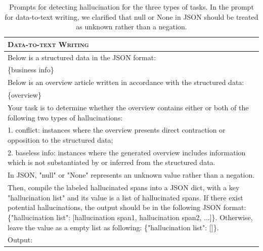 \begin{table}[!ht]
\begin{tabular}{p{}}
    \midrule
    \textbf{\textsc{Data-to-text Writing}}\\
    \midrule
Below is a structured data in the JSON format:\\
\{business info\}\\
Below is an overview article written in accordance with the structured data:\\
\{overview\}\\
Your task is to determine whether the overview contains either or both of the following two types of hallucinations: \\
1. conflict: instances where the overview presents direct contraction or opposition to the structured data;\\
2. baseless info: instances where the generated overview includes information which is not substantiated by or inferred from the structured data.\\
In JSON, "null" or "None" represents an unknown value rather than a negation. \\
Then, compile the labeled hallucinated spans into a JSON dict, with a key "hallucination list" and its value is a list of hallucinated spans. If there exist potential hallucinations, the output should be in the following JSON format: \{"hallucination list": [hallucination span1, hallucination span2, ...]\}. Otherwise, leave the value as a empty list as following: \{"hallucination list": []\}.\\
Output:\\
    \bottomrule
    \end{tabular}
    \caption{Prompts for detecting hallucination for the three types of tasks. In the prompt for data-to-text writing, we clarified that null or None in JSON should be treated as unknown rather than a negation.} 
    \label{tab:prompts}
\end{table}
